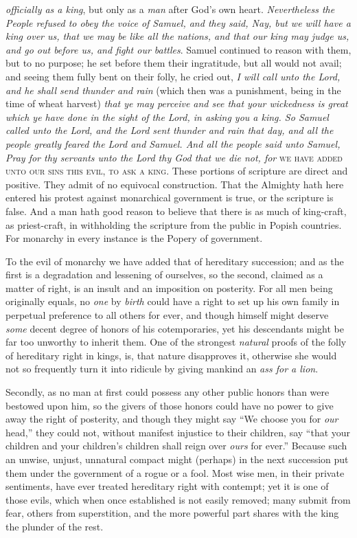 \documentclass[12pt, twocolumn]{book}
\begin{document}
\textit{officially as a king}, but only as a \textit{man} after God’s own heart. \textit{\small Nevertheless the People refused to obey the voice of Samuel, and they said, Nay, but we will have a king over us, that we may be like all the nations, and that our king may judge us, and go out before us, and fight our battles}. Samuel continued to reason with them, but to no purpose; he set before them their ingratitude, but all would not avail; and seeing them fully bent on their folly, he cried out, \textit{\small I will call unto the Lord, and he shall send thunder and rain} (which then was a punishment, being in the time of wheat harvest) \textit{\small that ye may perceive and see that your wickedness is great which ye have done in the sight of the Lord, in asking you a king. So Samuel called unto the Lord, and the Lord sent thunder and rain that day, and all the people greatly feared the Lord and Samuel. And all the people said unto Samuel, Pray for thy servants unto the Lord thy God that we die not, for} \textsc{we have added unto our sins this evil, to ask a king}. These portions of scripture are direct and positive. They admit of no equivocal construction. That the Almighty hath here entered his protest against monarchical government is true, or the scripture is false. And a man hath good reason to believe that there is as much of king-craft, as priest-craft, in withholding the scripture from the public in Popish countries. For monarchy in every instance is the Popery of government.

    To the evil of monarchy we have added that of hereditary succession; and as the first is a degradation and lessening of ourselves, so the second, claimed as a matter of right, is an insult and an imposition on posterity. For all men being originally equals, no \textit{one} by \textit{birth} could have a right to set up his own family in perpetual preference to all others for ever, and though himself might deserve \textit{some} decent degree of honors of his cotemporaries, yet his descendants might be far too unworthy to inherit them. One of the strongest \textit{natural} proofs of the folly of hereditary right in kings, is, that nature disapproves it, otherwise she would not so frequently turn it into ridicule by giving mankind an \textit{ass for a lion}.

    Secondly, as no man at first could possess any other public honors than were bestowed upon him, so the givers of those honors could have no power to give away the right of posterity, and though they might say “We choose you for \textit{our} head,” they could not, without manifest injustice to their children, say “that your children and your children’s children shall reign over \textit{ours} for ever.” Because such an unwise, unjust, unnatural compact might (perhaps) in the next succession put them under the government of a rogue or a fool. Most wise men, in their private sentiments, have ever treated hereditary right with contempt; yet it is one of those evils, which when once established is not easily removed; many submit from fear, others from superstition, and the more powerful part shares with the king the plunder of the rest.
\end{document}
